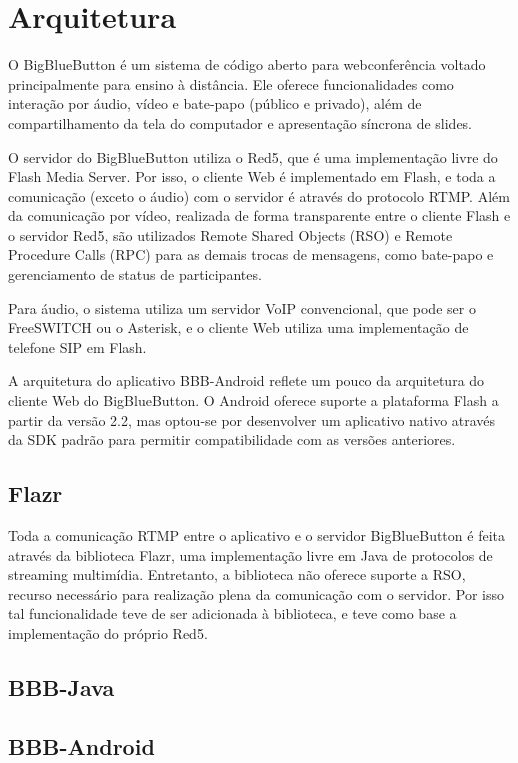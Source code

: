 \documentclass{acm_proc_article-sp}
\begin{document}
\section{Arquitetura}

O BigBlueButton é um sistema de código aberto para webconferência voltado principalmente para ensino à distância. Ele oferece funcionalidades como interação por áudio, vídeo e bate-papo (público e privado), além de compartilhamento da tela do computador e apresentação síncrona de slides.

O servidor do BigBlueButton utiliza o Red5, que é uma implementação livre do Flash Media Server. Por isso, o cliente Web é implementado em Flash, e toda a comunicação (exceto o áudio) com o servidor é através do protocolo RTMP. Além da comunicação por vídeo, realizada de forma transparente entre o cliente Flash e o servidor Red5, são utilizados Remote Shared Objects (RSO) e Remote Procedure Calls (RPC) para as demais trocas de mensagens, como bate-papo e gerenciamento de status de participantes.

Para áudio, o sistema utiliza um servidor VoIP convencional, que pode ser o FreeSWITCH ou o Asterisk, e o cliente Web utiliza uma implementação de telefone SIP em Flash.

A arquitetura do aplicativo BBB-Android reflete um pouco da arquitetura do cliente Web do BigBlueButton. O Android oferece suporte a plataforma Flash a partir da versão 2.2, mas optou-se por desenvolver um aplicativo nativo através da SDK padrão para permitir compatibilidade com as versões anteriores.

\subsection{Flazr}

Toda a comunicação RTMP entre o aplicativo e o servidor BigBlueButton é feita através da biblioteca Flazr, uma implementação livre em Java de protocolos de streaming multimídia. Entretanto, a biblioteca não oferece suporte a RSO, recurso necessário para realização plena da comunicação com o servidor. Por isso tal funcionalidade teve de ser adicionada à biblioteca, e teve como base a implementação do próprio Red5.

\subsection{BBB-Java}

\subsection{BBB-Android}
\end{document}
